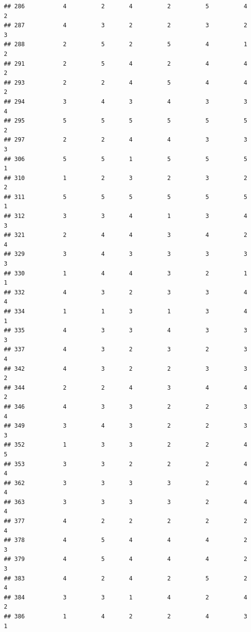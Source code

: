 \documentclass[
]{article}
\begin{document}
\begin{verbatim}
## 286           4          2       4          2          5          4        2
## 287           4          3       2          2          3          2        3
## 288           2          5       2          5          4          1        2
## 291           2          5       4          2          4          4        2
## 293           2          2       4          5          4          4        2
## 294           3          4       3          4          3          3        4
## 295           5          5       5          5          5          5        2
## 297           2          2       4          4          3          3        3
## 306           5          5       1          5          5          5        1
## 310           1          2       3          2          3          2        2
## 311           5          5       5          5          5          5        1
## 312           3          3       4          1          3          4        3
## 321           2          4       4          3          4          2        4
## 329           3          4       3          3          3          3        3
## 330           1          4       4          3          2          1        1
## 332           4          3       2          3          3          4        4
## 334           1          1       3          1          3          4        1
## 335           4          3       3          4          3          3        3
## 337           4          3       2          3          2          3        4
## 342           4          3       2          2          3          3        2
## 344           2          2       4          3          4          4        2
## 346           4          3       3          2          2          3        4
## 349           3          4       3          2          2          3        3
## 352           1          3       3          2          2          4        5
## 353           3          3       2          2          2          4        4
## 362           3          3       3          3          2          4        4
## 363           3          3       3          3          2          4        4
## 377           4          2       2          2          2          2        4
## 378           4          5       4          4          4          2        3
## 379           4          5       4          4          4          2        3
## 383           4          2       4          2          5          2        4
## 384           3          3       1          4          2          4        2
## 386           1          4       2          2          4          3        1

\end{verbatim}
\end{document}
